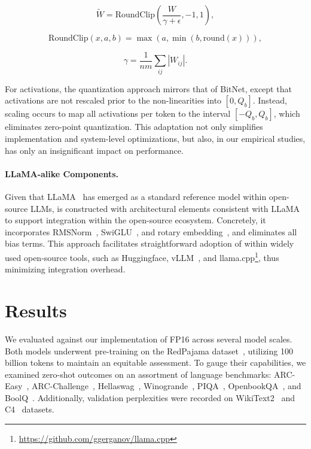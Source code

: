 \begin{equation}
    \widetilde{W} = \mathrm{RoundClip}(\frac{W}{\gamma + \epsilon}, -1, 1),
\end{equation}

\begin{equation}
    \mathrm{RoundClip}(x, a, b) = \max(a, \min(b, \mathrm{round}(x))),
\end{equation}

\begin{equation}
    \gamma = \frac{1}{nm}\sum_{ij} |W_{ij}|.
\end{equation}

For activations, the quantization approach mirrors that of BitNet, except that activations are not rescaled prior to the non-linearities into $[0, Q_b]$. Instead, scaling occurs to map all activations per token to the interval $[-Q_b, Q_b]$, which eliminates zero-point quantization. This adaptation not only simplifies implementation and system-level optimizations, but also, in our empirical studies, has only an insignificant impact on performance.

\paragraph{LLaMA-alike Components.}

Given that LLaMA~\cite{llama, llama2} has emerged as a standard reference model within open-source LLMs,  is constructed with architectural elements consistent with LLaMA to support integration within the open-source ecosystem. Concretely, it incorporates RMSNorm~\cite{rmsnorm}, SwiGLU~\cite{swiglu}, and rotary embedding~\cite{rope}, and eliminates all bias terms. This approach facilitates straightforward adoption of  within widely used open-source tools, such as Huggingface, vLLM~\cite{vllm}, and llama.cpp\footnote{\url{https://github.com/ggerganov/llama.cpp}}, thus minimizing integration overhead.

\section{Results}

We evaluated  against our implementation of FP16  across several model scales. Both models underwent pre-training on the RedPajama dataset~\cite{redpajama}, utilizing 100 billion tokens to maintain an equitable assessment. To gauge their capabilities, we examined zero-shot outcomes on an assortment of language benchmarks: ARC-Easy~\cite{arc}, ARC-Challenge~\cite{arc}, Hellaswag~\cite{hellaswag}, Winogrande~\cite{winoGrande}, PIQA~\cite{piqa}, OpenbookQA~\cite{openbookqa}, and BoolQ~\cite{boolq}. Additionally, validation perplexities were recorded on WikiText2~\cite{wikitext2} and C4~\cite{c4} datasets.

